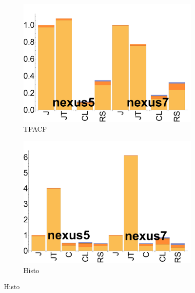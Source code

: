 \begin{figure}[ht]
  \begin{subfigure}[b]{0.25\textwidth}
      \centering
      \includegraphics[width=\textwidth]{data/bbattery_tpacf.pdf}
      \caption{TPACF} \label{fig:b_TPACF}
  \end{subfigure}%

  \begin{subfigure}[b]{0.25\textwidth}
      \centering
      \includegraphics[width=\textwidth]{data/bbattery_histogram.pdf}
      \caption{Histo}\label{fig:b_histo}
  \end{subfigure}%


\end{figure}
